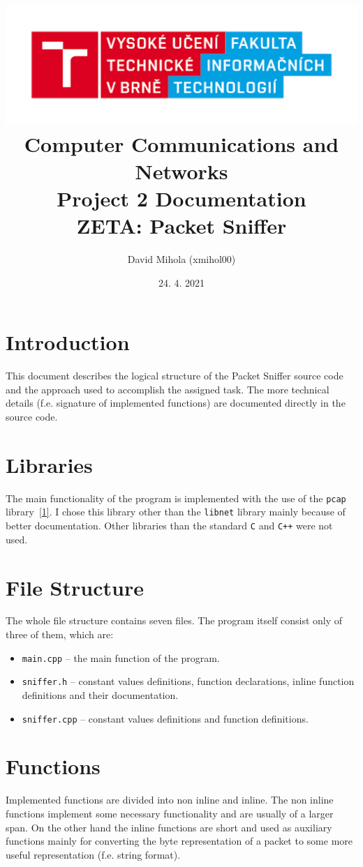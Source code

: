 \documentclass[12pt]{article}
\title{
\vspace{2em}
\includegraphics[scale=0.75]{logo.png}\\
\Large{Computer Communications and Networks\\Project 2 Documentation}\\
\vspace{2em}
\Huge{ZETA: Packet Sniffer}
\vspace{1em}
}
\author{David Mihola (xmihol00)}
\date{24. 4. 2021}
\begin{document}
\pagecolor{white}
	\maketitle
	\thispagestyle{empty}
\newpage

\tableofcontents
\newpage
\section{Introduction}
This document describes the logical structure of the Packet Sniffer source code and the approach used to accomplish the assigned task. The more technical details (f.e. signature of implemented functions) are documented directly in the source code.

\section{Libraries}
The main functionality of the program is implemented with the use of the \texttt{pcap} library~\hyperref[cit1]{[1]}. I chose this library other than the \texttt{libnet} library mainly because of better documentation. Other libraries than the standard \texttt{C} and \texttt{C++} were not used.

\section{File Structure}
The whole file structure contains seven files. The program itself consist only of three of them, which are:
\begin{itemize}
	\item \texttt{main.cpp} -- the main function of the program.
    \item \texttt{sniffer.h} -- constant values definitions, function declarations, inline function definitions and their documentation.
    \item \texttt{sniffer.cpp} -- constant values definitions and function definitions.
\end{itemize}

\section{Functions}
Implemented functions are divided into non inline and inline.
The non inline functions implement some necessary functionality and are usually of a larger span. On the other hand the inline functions are short and used as auxiliary functions mainly for converting the byte representation of a packet to some more useful representation (f.e. string format).
\end{document}
